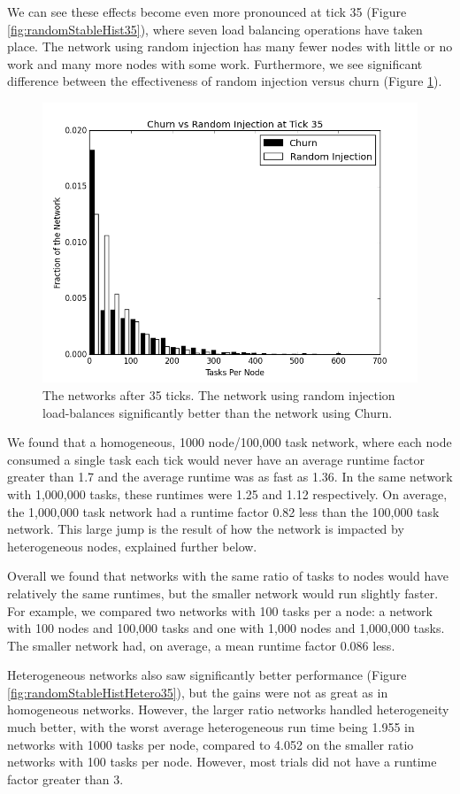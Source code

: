 \documentclass[11pt,letterpaper]{article}
\begin{document}
{	We can see these effects become even more pronounced at tick 35 (Figure \ref{fig:randomStableHist35}), where seven load balancing operations have taken place.
	The network using random injection has many fewer nodes with little or no work and many more nodes with some work.
	Furthermore, we see significant difference between the effectiveness of random injection versus churn (Figure \ref{fig:churnInjectionHist35}).
	
	\begin{figure}
		\centering
		\includegraphics[width=0.7\linewidth]{figs/churnInjectionHist35}
		\caption[Churn vs Random Injection after 35 ticks.]{The networks after 35 ticks.  The network using random injection load-balances significantly better than the network using Churn.}
		\label{fig:churnInjectionHist35}
	\end{figure}
	
	We found that a homogeneous, 1000 node/100,000 task network, where each node consumed a single task each tick would never have an average runtime factor greater than 1.7 and the average runtime was as fast as 1.36.
	In the same network with 1,000,000 tasks, these runtimes were 1.25 and 1.12 respectively.
	On average, the 1,000,000 task network had a runtime factor 0.82 less than the 100,000 task network.
	This large jump is the result of how the network is impacted by heterogeneous nodes, explained further below.
	
	Overall we found that networks with the same ratio of tasks to nodes would have relatively the same runtimes, but the smaller network would run slightly faster.
	For example, we compared two networks with 100 tasks per a node: a network with 100 nodes and 100,000 tasks and one with 1,000 nodes and 1,000,000 tasks.
	The smaller network had, on average, a mean runtime factor 0.086 less.
	
	Heterogeneous networks also saw significantly better performance (Figure \ref{fig:randomStableHistHetero35}), but the gains were not as great as in homogeneous networks.
	However, the larger ratio networks handled heterogeneity much better, with the worst average heterogeneous run time being 1.955 in networks with 1000 tasks per node, compared to 4.052 on the smaller ratio networks with 100 tasks per node.
	However, most trials did not have a runtime factor greater than 3.
	
}
\end{document}
